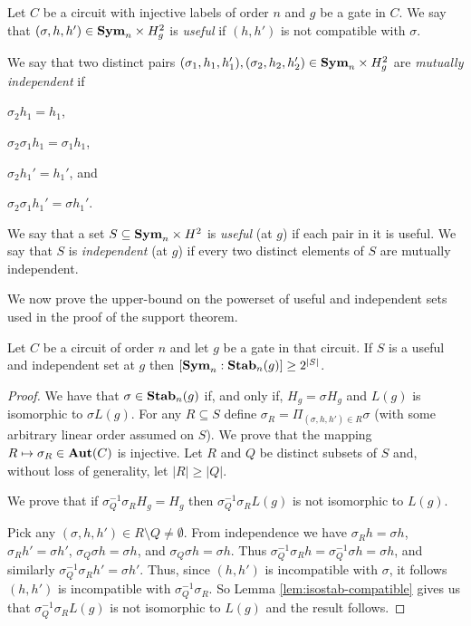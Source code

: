 \documentclass[../main/thesis.tex]{subfiles}
\begin{document}
\begin{definition}
  Let $C$ be a circuit with injective labels of order $n$ and $g$ be a gate in
  $C$. We say that $(\sigma, h, h') \in \text{\textbf{Sym}}_n \times H^2_g$ is \emph{useful} if
  $(h, h')$ is not compatible with $\sigma$.

  We say that two distinct pairs $(\sigma_1, h_1, h_1'), (\sigma_2, h_2, h_2')
  \in \text{\textbf{Sym}}_n\times H^2_g$ are \emph{mutually independent} if
  \begin{myitemize}
  \item $\sigma_2 h_1 = h_1$,
  \item $\sigma_2 \sigma_1 h_1 = \sigma_1 h_1$,
  \item $\sigma_2 h_1' = h_1'$, and
  \item $\sigma_2 \sigma_1 h_1' = \sigma h_1'$.
  \end{myitemize}
  We say that a set $S \subseteq \text{\textbf{Sym}}_n \times H^2$ is \emph{useful} (at $g$) if
  each pair in it is useful. We say that $S$ is \emph{independent} (at $g$) if
  every two distinct elements of $S$ are mutually independent.
\end{definition}

We now prove the upper-bound on the powerset of useful and independent sets used
in the proof of the support theorem.

\begin{lem}
  \label{lem:useful-independant-set}
  Let $C$ be a circuit of order $n$ and let $g$ be a gate in that circuit. If
  $S$ is a useful and independent set at $g$ then $[\text{\textbf{Sym}}_n : \text{\textbf{Stab}}_n(g)] \geq
  2^{\vert S \vert}$.
\end{lem}
\begin{proof}
  We have that $\sigma \in \text{\textbf{Stab}}_n(g)$ if, and only if, $H_g = \sigma H_g$ and
  $L(g)$ is isomorphic to $\sigma L(g)$. For any $R \subseteq S$ define
  $\sigma_R = \Pi_{(\sigma, h, h') \in R} \sigma$ (with some arbitrary linear
  order assumed on $S$). We prove that the mapping $R \mapsto \sigma_R
  \in\text{\textbf{Aut}}(C)$ is injective. Let $R$ and $Q$ be distinct subsets of $S$ and,
  without loss of generality, let $\vert R \vert \geq \vert Q \vert$.

  We prove that if $\sigma^{-1}_Q \sigma_R H_g = H_g$ then $\sigma^{-1}_Q
  \sigma_R L(g)$ is not isomorphic to $L(g)$.

  Pick any $(\sigma, h, h') \in R \setminus Q \neq \emptyset$. From independence
  we have $\sigma_R h = \sigma h$, $\sigma_R h' = \sigma h'$, $\sigma_Q \sigma h
  = \sigma h $, and $\sigma_Q \sigma h = \sigma h$. Thus $\sigma^{-1}_Q \sigma_R
  h = \sigma^{-1}_Q \sigma h = \sigma h$, and similarly $\sigma^{-1}_Q\sigma_R
  h' = \sigma h'$. Thus, since $(h, h')$ is incompatible with $\sigma$, it
  follows $(h, h')$ is incompatible with $\sigma^{-1}_Q\sigma_R$. So Lemma
  \ref{lem:isostab-compatible} gives us that $\sigma^{-1}_Q \sigma_R L(g)$ is
  not isomorphic to $L(g)$ and the result follows.
\end{proof}
\end{document}
